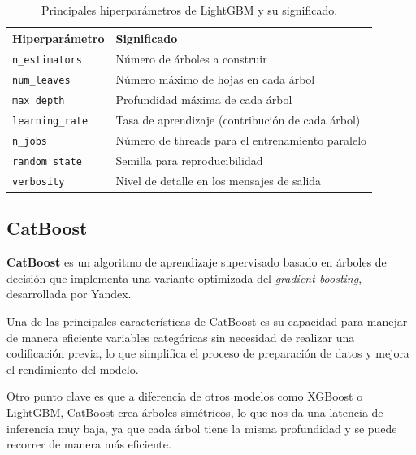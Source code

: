 \begin{table}[H]
    \centering
    \caption{Principales hiperparámetros de LightGBM y su significado.}
    \label{tab:lightgbm_hyperparams}
    \begin{tabular}{ll}
        \toprule
        \textbf{Hiperparámetro} & \textbf{Significado} \\
        \midrule
        \texttt{n\_estimators} & Número de árboles a construir \\
        \texttt{num\_leaves} & Número máximo de hojas en cada árbol \\
        \texttt{max\_depth} & Profundidad máxima de cada árbol \\
        \texttt{learning\_rate} & Tasa de aprendizaje (contribución de cada árbol) \\
        \texttt{n\_jobs} & Número de threads para el entrenamiento paralelo \\
        \texttt{random\_state} & Semilla para reproducibilidad \\
        \texttt{verbosity} & Nivel de detalle en los mensajes de salida \\
        \bottomrule
    \end{tabular}
\end{table}


\subsection{CatBoost}

\textbf{CatBoost} es un algoritmo de aprendizaje supervisado basado en árboles de decisión que implementa una variante optimizada del \textit{gradient boosting}, desarrollada por Yandex.

Una de las principales características de CatBoost es su capacidad para manejar de manera eficiente variables categóricas sin necesidad de realizar una codificación previa, lo que simplifica el proceso de preparación de datos y mejora el rendimiento del modelo.

Otro punto clave es que a diferencia de otros modelos como XGBoost o LightGBM, CatBoost crea árboles simétricos, lo que nos da una latencia de inferencia muy baja, ya que cada árbol tiene la misma profundidad y se puede recorrer de manera más eficiente.

